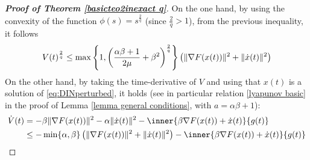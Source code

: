 \documentclass[reqno]{amsart}
\theoremstyle{plain}
\theoremstyle{definition}
\theoremstyle{remark}
\DeclarePairedDelimiter{\norm}{\lVert}{\rVert}	%
\begin{document}
\begin{proof}[\textbf{Proof of Theorem \ref{basicteo2inexact q}}]
	On the one hand, by using the convexity of the function $\phi(s)=s^{\frac{2}{q}}$ (since $\frac{2}{q}>1$), from the previous inequality, it follows
	\begin{equation}\label{proof q 1}
		V(t)^{\frac{2}{q}} \leq \max\left\{1,\left(\frac{\alpha\beta+1}{2\mu }+\beta^{2}\right)^{\frac{2}{q}}\right\}\left(\norm{\nabla F(x(t))}^{2} +\norm{\dot{x}(t)}^{2}\right)
	\end{equation}	
On the other hand, by taking the time-derivative of $V$ and using that $x(t)$ is a solution of \eqref{eq:DINperturbed}, it holds (see in particular relation \eqref{lyapunov basic} in the proof of Lemma \ref{lemma general conditions}, with $a=\alpha\beta+1$):
	\begin{equation}\label{proof q 2}
		\begin{aligned}
			\dot{V}(t) &= -\beta\norm{\nabla F(x(t))}^{2} -\alpha\norm{\dot{x}(t)}^{2} -\inner{\beta\nabla F(x(t)) + \dot{x}(t)}{g(t)} \\ &\leq -\min\{\alpha,\beta\}\left(\norm{\nabla F(x(t))}^{2} +\norm{\dot{x}(t)}^{2}\right)
			-\inner{\beta\nabla F(x(t))+\dot{x}(t)}{g(t)}
		\end{aligned}
	\end{equation} 
	

\end{proof}
\end{document}
